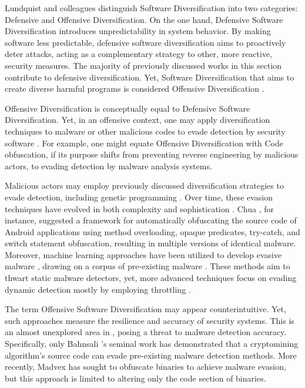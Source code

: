 \label{offensive_definition}
Lundquist and colleagues \cite{offensive_div} distinguish Software Diversification into two categories: Defensive and Offensive Diversification. 
On the one hand, Defensive Software Diversification introduces unpredictability in system behavior. 
By making software less predictable, defensive software diversification aims to proactively deter attacks, acting as a complementary strategy to other, more reactive, security measures. 
The majority of previously discussed works in this section contribute to defensive diversification.
Yet, Software Diversification that aims to create diverse harmful programs is considered Offensive Diversification \cite{fred1986computer}.


\begin{strategy}   
    Offensive Diversification is conceptually equal to Defensive Software Diversification.
    Yet, in an offensive context, one may apply diversification techniques to malware or other malicious codes to evade detection by security software \cite{8714698}.
    For example, one might equate Offensive Diversification with Code obfuscation, if its purpose shifts from preventing reverse engineering by malicious actors, to evading detection by malware analysis systems.
    
\end{strategy}


Malicious actors may employ previously discussed diversification strategies to evade detection, including genetic programming \cite{castro2019aimed}.
Over time, these evasion techniques have evolved in both complexity and sophistication \cite{Aghakhani2020WhenMI}.
Chua \etal \cite{chua}, for instance, suggested a framework for automatically obfuscating the source code of Android applications using method overloading, opaque predicates, try-catch, and switch statement obfuscation, resulting in multiple versions of identical malware.
Moreover, machine learning approaches have been utilized to develop evasive malware \cite{2021arXiv211111487D}, drawing on a corpus of pre-existing malware \cite{Bostani2021EvadeDroidAP}.
These methods aim to thwart static malware detectors, yet, more advanced techniques focus on evading dynamic detection mostly by employing throttling \cite{Lu2013WeaknessesID, payer2014embracing}.


The term Offensive Software Diversification may appear counterintuitive.
Yet, such approaches measure the resilience and accuracy of security systems. 
This is an almost unexplored area in \Wasm, posing a threat to malware detection accuracy. 
Specifically, only Bahnsali \etal's seminal work\cite{10.1145/3507657.3528560} has demonstrated that a cryptomining algorithm's source code can evade pre-existing malware detection methods. 
More recently, Madvex \cite{madvex} has sought to obfuscate \Wasm binaries to achieve malware evasion, but this approach is limited to altering only the code section of \Wasm binaries.


